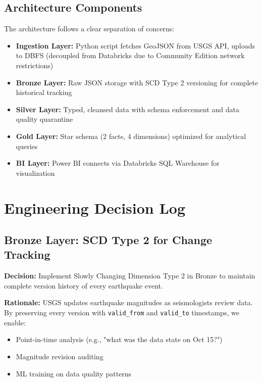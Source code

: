 \documentclass[11pt,a4paper]{article}
\begin{document}
\newpage

\subsection{Architecture Components}

The architecture follows a clear separation of concerns:

\begin{itemize}[leftmargin=*,nosep]
    \item \textbf{Ingestion Layer:} Python script fetches GeoJSON from USGS API, uploads to DBFS (decoupled from Databricks due to Community Edition network restrictions)
    \item \textbf{Bronze Layer:} Raw JSON storage with SCD Type 2 versioning for complete historical tracking
    \item \textbf{Silver Layer:} Typed, cleansed data with schema enforcement and data quality quarantine
    \item \textbf{Gold Layer:} Star schema (2 facts, 4 dimensions) optimized for analytical queries
    \item \textbf{BI Layer:} Power BI connects via Databricks SQL Warehouse for visualization
\end{itemize}

\newpage

\section{Engineering Decision Log}

\subsection{Bronze Layer: SCD Type 2 for Change Tracking}

\noindent\textbf{Decision:} Implement Slowly Changing Dimension Type 2 in Bronze to maintain complete version history of every earthquake event.

\noindent\textbf{Rationale:} USGS updates earthquake magnitudes as seismologists review data. By preserving every version with \texttt{valid\_from} and \texttt{valid\_to} timestamps, we enable:
\begin{itemize}[nosep]
    \item Point-in-time analysis (e.g., "what was the data state on Oct 15?")
    \item Magnitude revision auditing
    \item ML training on data quality patterns
\end{itemize}
\end{document}
